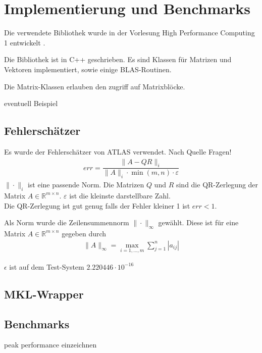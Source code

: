 \chapter{Implementierung und Benchmarks}
Die verwendete Bibliothek wurde in der Vorlesung High Performance Computing 1 entwickelt \cite{HPC1}.

Die Bibliothek ist in C++ geschrieben. Es sind Klassen für Matrizen und Vektoren implementiert, sowie einige BLAS-Routinen.

Die Matrix-Klassen erlauben den zugriff auf Matrixblöcke. 



eventuell Beispiel

\section{Fehlerschätzer}

Es wurde der Fehlerschätzer von ATLAS verwendet. Nach Quelle Fragen!
\begin{align}
	err = \dfrac{\|A - QR\|_i}{\|A\|_i \cdot \min(m,n) \cdot \varepsilon}
\end{align}
$\|\cdot\|_i$ ist eine passende Norm.
Die Matrizen $Q$ und $R$ sind die QR-Zerlegung der Matrix $A \in \mathbb{R}^{m \times n}$.
$\varepsilon$ ist die kleinste darstellbare Zahl.\\
Die QR-Zerlegung ist gut genug falls der Fehler kleiner 1 ist $ err < 1 $.

Als Norm wurde die Zeilensummennorm $\|\cdot\|_\infty$ gewählt.
Diese ist für eine Matrix $A \in \mathbb{R}^{m\times n}$ gegeben durch
\begin{align*}
	\|A\|_\infty = \max_{i=1,...,m} \sum_{j=1}^{n} |a_{ij}|
\end{align*}

$\epsilon$ ist auf dem Test-System $2.220446\cdot10^{-16}$

\section{MKL-Wrapper}



\section{Benchmarks}

peak performance einzeichnen